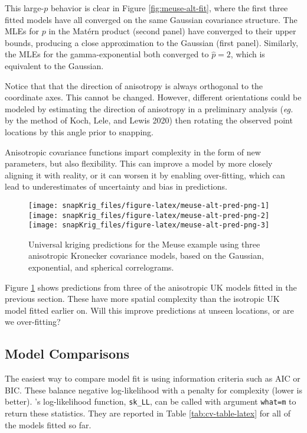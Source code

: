 This large-\(p\) behavior is clear in Figure \ref{fig:meuse-alt-fit}, where the first three fitted models have all converged on the same Gaussian covariance structure. The MLEs for \(p\) in the Matérn product (second panel) have converged to their upper bounds, producing a close approximation to the Gaussian (first panel). Similarly, the MLEs for the gamma-exponential both converged to \(\hat{p}=2\), which is equivalent to the Gaussian.

Notice that that the direction of anisotropy is always orthogonal to the coordinate axes. This cannot be changed. However, different orientations could be modeled by estimating the direction of anisotropy in a preliminary analysis (\emph{eg.} by the method of Koch, Lele, and Lewis 2020) then rotating the observed point locations by this angle prior to snapping.

Anisotropic covariance functions impart complexity in the form of new parameters, but also flexibility. This can improve a model by more closely aligning it with reality, or it can worsen it by enabling over-fitting, which can lead to underestimates of uncertainty and bias in predictions.

\begin{figure}[!bht]
\texttt{[image: snapKrig\_files/figure-latex/meuse-alt-pred-png-1]} \texttt{[image: snapKrig\_files/figure-latex/meuse-alt-pred-png-2]} \texttt{[image: snapKrig\_files/figure-latex/meuse-alt-pred-png-3]} \caption{Universal kriging predictions for the Meuse example using three anisotropic Kronecker covariance models, based on the Gaussian, exponential, and spherical correlograms.}\label{fig:meuse-alt-pred-png}
\end{figure}

Figure \ref{fig:meuse-alt-pred-png} shows predictions from three of the anisotropic UK models fitted in the previous section. These have more spatial complexity than the isotropic UK model fitted earlier on. Will this improve predictions at unseen locations, or are we over-fitting?

\hypertarget{model-comparisons}{%
\subsection{Model Comparisons}\label{model-comparisons}}

The easiest way to compare model fit is using information criteria such as AIC or BIC. These balance negative log-likelihood with a penalty for complexity (lower is better). 's log-likelihood function, \texttt{sk\_LL}, can be called with argument \texttt{what=\textquotesingle{}m\textquotesingle{}} to return these statistics. They are reported in Table
\ref{tab:cv-table-latex} for all of the models fitted so far.

